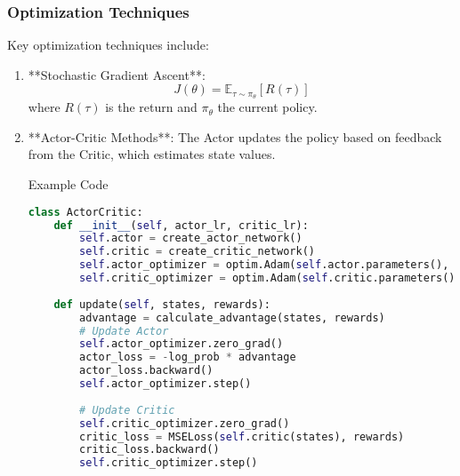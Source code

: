 \documentclass[aspectratio=169]{beamer}
\begin{document}
\begin{frame}[fragile]
    \frametitle{Optimization Techniques}
    Key optimization techniques include:
    \begin{enumerate}
        \item **Stochastic Gradient Ascent**:
        \begin{equation}
        J(\theta) = \mathbb{E}_{\tau \sim \pi_{\theta}} [R(\tau)]
        \end{equation}
        where \( R(\tau) \) is the return and \( \pi_{\theta} \) the current policy.
        
        \item **Actor-Critic Methods**:
        The Actor updates the policy based on feedback from the Critic, which estimates state values. 
        \begin{block}{Example Code}
        \begin{lstlisting}[language=Python]
class ActorCritic:
    def __init__(self, actor_lr, critic_lr):
        self.actor = create_actor_network()
        self.critic = create_critic_network()
        self.actor_optimizer = optim.Adam(self.actor.parameters(), lr=actor_lr)
        self.critic_optimizer = optim.Adam(self.critic.parameters(), lr=critic_lr)
        
    def update(self, states, rewards):
        advantage = calculate_advantage(states, rewards)
        # Update Actor
        self.actor_optimizer.zero_grad()
        actor_loss = -log_prob * advantage
        actor_loss.backward()
        self.actor_optimizer.step()
        
        # Update Critic
        self.critic_optimizer.zero_grad()
        critic_loss = MSELoss(self.critic(states), rewards)
        critic_loss.backward()
        self.critic_optimizer.step()
        \end{lstlisting}
        \end{block}
    \end{enumerate}
\end{frame}
\end{document}
